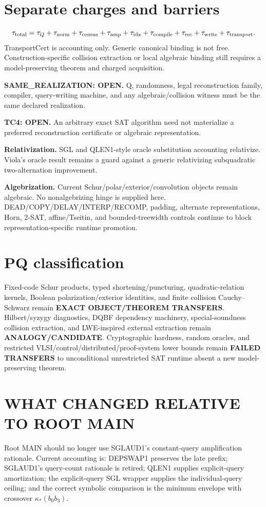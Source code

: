 \documentclass[11pt]{article}
\begin{document}
\section*{Separate charges and barriers}
\[
\tau_{\rm total}=\tau_Q+\tau_{\rm norm}+\tau_{\rm census}+\tau_{\rm amp}+\tau_{\rm idx}+\tau_{\rm compile}+\tau_{\rm rec}+\tau_{\rm write}+\tau_{\rm transport}.
\]
TransportCert is accounting only. Generic canonical binding is not free. Construction-specific collision extraction or local algebraic binding still requires a model-preserving theorem and charged acquisition.

\textbf{SAME_REALIZATION: OPEN.} Q, randomness, legal reconstruction family, compiler, query-writing machine, and any algebraic/collision witness must be the same declared realization.

\textbf{TC4: OPEN.} An arbitrary exact SAT algorithm need not materialize a preferred reconstruction certificate or algebraic representation.

\textbf{Relativization.} SGL and QLEN1-style oracle substitution accounting relativize. Viola's oracle result remains a guard against a generic relativizing subquadratic two-alternation improvement.

\textbf{Algebrization.} Current Schur/polar/exterior/convolution objects remain algebraic. No nonalgebrizing hinge is supplied here. DEAD/COPY/DELAY/INTERP/RECOMP, padding, alternate representations, Horn, 2-SAT, affine/Tseitin, and bounded-treewidth controls continue to block representation-specific runtime promotion.

\section*{PQ classification}
Fixed-code Schur products, typed shortening/puncturing, quadratic-relation kernels, Boolean polarization/exterior identities, and finite collision Cauchy--Schwarz remain \textbf{EXACT OBJECT/THEOREM TRANSFERS}. Hilbert/syzygy diagnostics, DQBF dependency machinery, special-soundness collision extraction, and LWE-inspired external extraction remain \textbf{ANALOGY/CANDIDATE}. Cryptographic hardness, random oracles, and restricted VLSI/control/distributed/proof-system lower bounds remain \textbf{FAILED TRANSFERS} to unconditional unrestricted SAT runtime absent a new model-preserving theorem.

\section*{WHAT CHANGED RELATIVE TO ROOT MAIN}
Root MAIN should no longer use SGLAUD1's constant-query amplification rationale. Current accounting is: DEPSWAP1 preserves the late prefix; SGLAUD1's query-count rationale is retired; QLEN1 supplies explicit-query amortization; the explicit-query SGL wrapper supplies the individual-query ceiling; and the correct symbolic comparison is the minimum envelope with crossover \(\kappa_*(b_0b_3)\).
\end{document}
